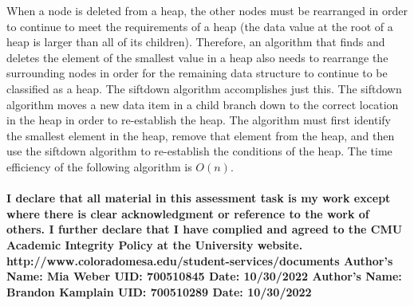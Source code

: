 \documentclass{article}
\begin{document}
When a node is deleted from a heap, the other nodes must be rearranged in order to continue to meet the requirements of a heap (the data value at the root of a heap is larger than all of its children). Therefore, an algorithm that finds and deletes the element of the smallest value in a heap also needs to rearrange the surrounding nodes in order for the remaining data structure to continue to be classified as a heap. The siftdown algorithm accomplishes just this. The siftdown algorithm moves a new data item in a child branch down to the correct location in the heap in order to re-establish the heap. The algorithm must first identify the smallest element in the heap, remove that element from the heap, and then use the siftdown algorithm to re-establish the conditions of the heap. The time efficiency of the following algorithm is $O(n)$.

\paragraph{\linebreak I declare that all material in this assessment task is my work except where there is clear acknowledgment or reference to the work of others. I further declare that I have complied and agreed to the CMU Academic Integrity Policy at the University website.
\linebreak  http://www.coloradomesa.edu/student-services/documents
\linebreak \linebreak Author’s Name: Mia Weber UID: 700510845 Date: 10/30/2022
\linebreak Author's Name: Brandon Kamplain UID: 700510289 Date: 10/30/2022}
\end{document}
